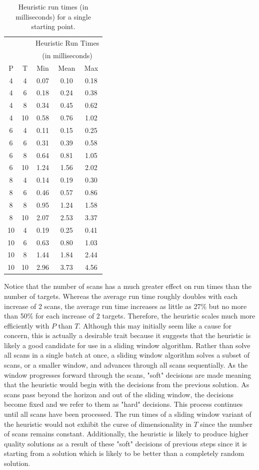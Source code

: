 \documentclass[journal]{IEEEtran}
\begin{document}
\begin{table}[ht]
\centering
\begin{tabular}{cc|ccc}
  \hline
   & & \multicolumn{3}{c}{Heuristic Run Times } \\
   & & \multicolumn{3}{c}{(in milliseconds)}\\
   P & T & Min & Mean & Max \\ 
  \hline
  \hline
   4 & 4 & 0.07 & 0.10 & 0.18 \\ 
   4 & 6 & 0.18 & 0.24 & 0.38 \\ 
   4 & 8 & 0.34 & 0.45 & 0.62 \\ 
   4 & 10 & 0.58 & 0.76 & 1.02 \\ 
   6 & 4 & 0.11 & 0.15 & 0.25 \\ 
   6 & 6 & 0.31 & 0.39 & 0.58 \\ 
   6 & 8 & 0.64 & 0.81 & 1.05 \\ 
   6 & 10 & 1.24 & 1.56 & 2.02 \\ 
   8 & 4 & 0.14 & 0.19 & 0.30 \\ 
   8 & 6 & 0.46 & 0.57 & 0.86 \\ 
   8 & 8 & 0.95 & 1.24 & 1.58 \\ 
   8 & 10 & 2.07 & 2.53 & 3.37 \\ 
   10 & 4 & 0.19 & 0.25 & 0.41 \\ 
   10 & 6 & 0.63 & 0.80 & 1.03 \\ 
   10 & 8 & 1.44 & 1.84 & 2.44 \\ 
   10 & 10 & 2.96 & 3.73 & 4.56 \\ 
   \hline
\end{tabular}
\caption{Heuristic run times (in milliseconds) for a single starting point.}
\label{tab:Basic_heuristic_times}
\end{table}

Notice that the number of scans has a much greater effect on run times than the number of targets. Whereas the average run time roughly doubles with each increase of 2 scans, the average run time increases as little as 27\% but no more than 50\% for each increase of 2 targets. Therefore, the heuristic scales much more efficiently with $P$ than $T$. Although this may initially seem like a cause for concern, this is actually a desirable trait because it suggests that the heuristic is likely a good candidate for use in a sliding window algorithm. Rather than solve all scans in a single batch at once, a sliding window algorithm solves a subset of scans, or a smaller window, and advances through all scans sequentially.  As the window progresses forward through the scans, "soft" decisions are made meaning that the heuristic would begin with the decisions from the previous solution. As scans pass beyond the horizon and out of the sliding window, the decisions become fixed and we refer to them as "hard" decisions. This process continues until all scans have been processed. The run times of a sliding window variant of the heuristic would not exhibit the curse of dimensionality in $T$ since the number of scans remains constant. Additionally, the heuristic is likely to produce higher quality solutions as a result of these "soft" decisions of previous steps since it is starting from a solution which is likely to be better than a completely random solution. 
\end{document}
